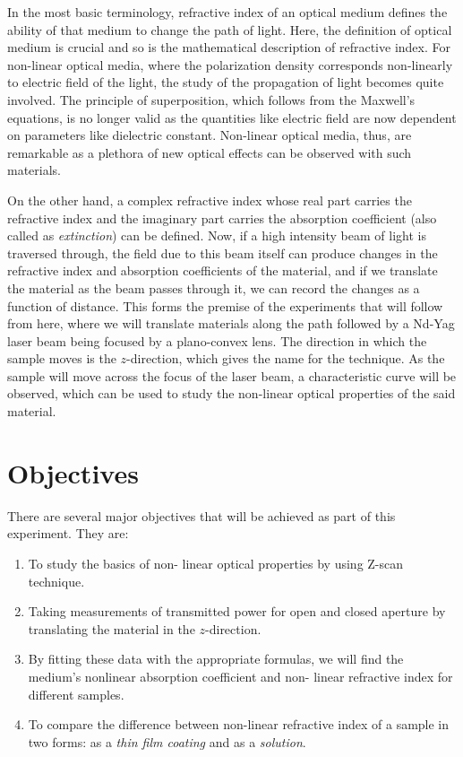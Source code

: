 \documentclass[%
 reprint,
 amsmath,amssymb,
 aps,
]{revtex4-2}
\begin{document}
	\par
	In the most basic terminology, refractive index of an optical medium defines the ability of that medium to change the path of light. Here, the definition of optical medium is crucial and so is the mathematical description of refractive index. For non-linear optical media, where the polarization density corresponds non-linearly to electric field of the light, the study of the propagation of light becomes quite involved. The principle of superposition, which follows from the Maxwell's equations, is no longer valid as the quantities like electric field are now dependent on parameters like dielectric constant. Non-linear optical media, thus, are remarkable as a plethora of new optical effects can be observed with such materials.
	\par
	On the other hand, a complex refractive index whose real part carries the refractive index and the imaginary part carries the absorption coefficient (also called as \textit{extinction}) can be defined. Now, if a high intensity beam of light is traversed through, the field due to this beam itself can produce changes in the refractive index and absorption coefficients of the material, and if we translate the material as the beam passes through it, we can record the changes as a function of distance. This forms the premise of the experiments that will follow from here, where we will translate materials along the path followed by a Nd-Yag laser beam being focused by a plano-convex lens. The direction in which the sample moves is the $ z $-direction, which gives the name for the technique. As the sample will move across the focus of the laser beam, a characteristic curve will be observed, which can be used to study the non-linear optical properties of the said material.
	



\section{Objectives}
	There are several major objectives that will be achieved as part of this experiment. They are:
	\begin{enumerate}
		\item To study the basics of non-
		linear optical properties by
		using Z-scan technique.
		\item Taking measurements of transmitted power for open and
		closed aperture by translating
		the material in the $ z $-direction.
		\item By fitting these data with the
		appropriate formulas, we will
		find the medium's nonlinear
		absorption coefficient and non-
		linear refractive index for different samples.
		\item To compare the difference between non-linear refractive index of a sample in two forms: as a \textit{thin film coating} and as a \textit{solution}. 
	\end{enumerate}
\end{document}
